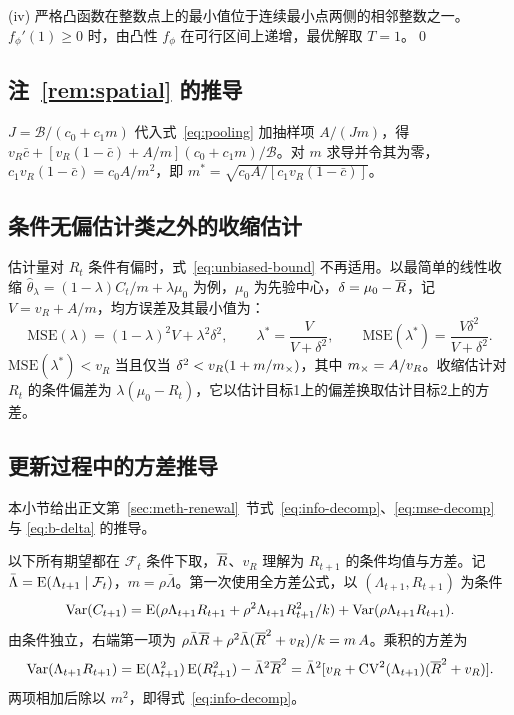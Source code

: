 (iv) 严格凸函数在整数点上的最小值位于连续最小点两侧的相邻整数之一。$f_\phi'(1)\geq0$ 时，由凸性 $f_\phi$ 在可行区间上递增，最优解取 $T=1$。\qed

\subsection{\texorpdfstring{注~\ref{rem:spatial} 的推导}{注 2 的推导}}

$J=\mathcal B/(c_0+c_1m)$ 代入式~\eqref{eq:pooling} 加抽样项 $A/(Jm)$，得 $v_R\bar c+[v_R(1-\bar c)+A/m](c_0+c_1m)/\mathcal B$。对 $m$ 求导并令其为零，$c_1v_R(1-\bar c)=c_0A/m^2$，即 $m^*=\sqrt{c_0A/[c_1v_R(1-\bar c)]}$。

\subsection{条件无偏估计类之外的收缩估计}
\label{app:shrink}

估计量对 $R_t$ 条件有偏时，式~\eqref{eq:unbiased-bound} 不再适用。以最简单的线性收缩 $\hat\theta_\lambda=(1-\lambda)C_t/m+\lambda\mu_0$ 为例，$\mu_0$ 为先验中心，$\delta=\mu_0-\overline{R}$，记 $V=v_R+A/m$，均方误差及其最小值为：
\begin{equation}
  \mathrm{MSE}(\lambda)=(1-\lambda)^2V+\lambda^2\delta^2,\qquad
  \lambda^*=\frac{V}{V+\delta^2},\qquad
  \mathrm{MSE}(\lambda^*)=\frac{V\delta^2}{V+\delta^2}.
  \label{eq:shrink}
\end{equation}
$\mathrm{MSE}(\lambda^*)<v_R$ 当且仅当 $\delta^2<v_R(1+m/m_{\times})$，其中 $m_{\times}=A/v_R$。收缩估计对 $R_t$ 的条件偏差为 $\lambda(\mu_0-R_t)$，它以估计目标1上的偏差换取估计目标2上的方差\citep{efron1975data}。

\subsection{更新过程中的方差推导}
\label{sec:s-renewal}

本小节给出正文第~\ref{sec:meth-renewal}~节式~\eqref{eq:info-decomp}、\eqref{eq:mse-decomp} 与 \eqref{eq:b-delta} 的推导。

以下所有期望都在 $\mathcal F_t$ 条件下取，$\overline{R}$、$v_R$ 理解为 $R_{t+1}$ 的条件均值与方差。记 $\bar\Lambda=\operatorname{E}(\Lambda_{t+1}\mid\mathcal F_t)$，$m=\rho\bar\Lambda$。第一次使用全方差公式，以 $(\Lambda_{t+1},R_{t+1})$ 为条件
\begin{equation}
  \operatorname{Var}(C_{t+1})=\operatorname{E}(\rho\Lambda_{t+1}R_{t+1}+\rho^2\Lambda_{t+1}R_{t+1}^2/k)+\operatorname{Var}(\rho\Lambda_{t+1}R_{t+1}).
\end{equation}
由条件独立，右端第一项为 $\rho\bar\Lambda\overline{R}+\rho^2\bar\Lambda(\overline{R}^2+v_R)/k=m\,A$。乘积的方差为
\begin{equation}
  \operatorname{Var}(\Lambda_{t+1}R_{t+1})=\operatorname{E}(\Lambda_{t+1}^2)\operatorname{E}(R_{t+1}^2)-\bar\Lambda^2\overline{R}^2
  =\bar\Lambda^2[v_R+\operatorname{CV}^2(\Lambda_{t+1})(\overline{R}^2+v_R)].
\end{equation}
两项相加后除以 $m^2$，即得式~\eqref{eq:info-decomp}。

